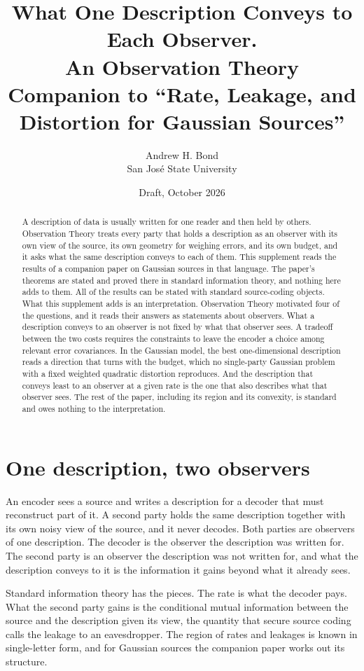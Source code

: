 \documentclass[11pt]{article}
\title{What One Description Conveys to Each Observer.\\[4pt]
\large An Observation Theory Companion to ``Rate, Leakage, and Distortion for Gaussian Sources''}
\author{Andrew H. Bond\\ San Jos\'e State University}
\date{Draft, October 2026}
\begin{document}
\maketitle

\begin{abstract}
A description of data is usually written for one reader and then held
by others. Observation Theory treats every party that holds a
description as an observer with its own view of the source, its own
geometry for weighing errors, and its own budget, and it asks what the
same description conveys to each of them. This supplement reads the
results of a companion paper on Gaussian sources in that language. The
paper's theorems are stated and proved there in standard information
theory, and nothing here adds to them. All of the results can be
stated with standard source-coding objects. What this supplement adds is
an interpretation. Observation Theory motivated four of the questions,
and it reads their answers as statements about observers. What a
description conveys to an observer is not fixed by what that observer
sees. A tradeoff between the two costs requires the constraints to leave
the encoder a choice among relevant error covariances. In the Gaussian
model, the best one-dimensional description reads a direction that turns
with the budget, which no single-party Gaussian problem with a fixed
weighted quadratic distortion reproduces. And the description that
conveys least to an observer at a given rate is the one that also
describes what that observer sees. The rest of the paper, including its
region and its convexity, is standard and owes nothing to the
interpretation.
\end{abstract}

\section{One description, two observers}
\label{sec:intro}

An encoder sees a source and writes a description for a decoder that
must reconstruct part of it. A second party holds the same description
together with its own noisy view of the source, and it never decodes.
Both parties are observers of one description. The decoder is the
observer the description was written for. The second party is an
observer the description was not written for, and what the description
conveys to it is the information it gains beyond what it already sees.

Standard information theory has the pieces. The rate is what the
decoder pays. What the second party gains is the conditional mutual
information between the source and the description given its view, the
quantity that secure source coding calls the leakage to an eavesdropper.
The region of rates and leakages is known in single-letter form, and
for Gaussian sources the companion paper \cite{paper} works out its
structure.
\end{document}
